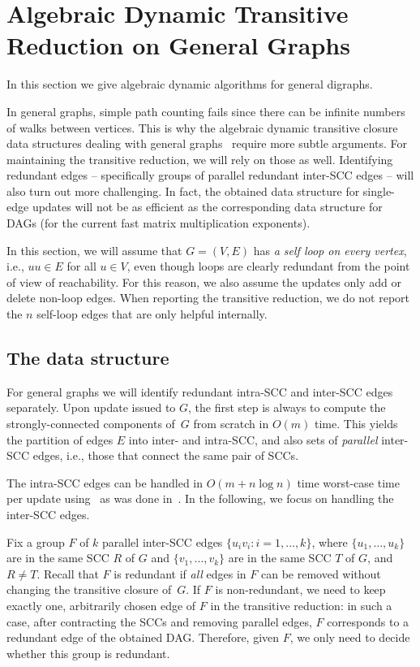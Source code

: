 \documentclass[11pt]{article}
\begin{document}
{ \section{Algebraic Dynamic Transitive Reduction on General Graphs}
\label{sec:app_algebraic_general}

In this section we give algebraic dynamic algorithms for general digraphs.


In general graphs, simple path counting fails since there can be infinite
numbers of walks between vertices. This is why the algebraic dynamic transitive closure
data structures dealing with general graphs~\cite{Sankowski04} require
more subtle arguments. For maintaining the transitive reduction, we will
rely on those as well. Identifying redundant edges -- specifically groups of parallel
redundant inter-SCC edges -- will also turn out more challenging.
In fact, the obtained data structure for single-edge updates will not be as efficient
as the corresponding data structure for DAGs (for the current fast matrix multiplication exponents).

In this section, we will assume that $G=(V,E)$ has \emph{a self loop on every vertex},
i.e., $uu\in E$ for all $u\in V$, even though loops are clearly
redundant from the point of view of reachability.
For this reason, we also assume the updates only add or delete non-loop edges.
When reporting the transitive reduction, we do not report the $n$ self-loop edges
that are only helpful internally.

\newcommand{\asymb}{\tilde{A}}

\subsection{The data structure}
For general graphs we will identify redundant intra-SCC and inter-SCC edges separately.
Upon update issued to $G$, the first step is always to compute the strongly-connected
components of~$G$ from scratch in $O(m)$ time.
This yields the partition of edges $E$ into inter- and intra-SCC, and also sets of \emph{parallel} inter-SCC edges, i.e., those that connect
the same pair of SCCs.

The intra-SCC edges can be handled in $O(m+n\log{n})$ time worst-case time per update using~ as was done in~.
In the following, we focus on handling the inter-SCC edges.

Fix a group $F$ of $k$ parallel inter-SCC edges $\{u_iv_i:i=1,\ldots,k\}$,
where
$\{u_1,\ldots,u_k\}$ are in the same SCC $R$ of $G$
and $\{v_1,\ldots,v_k\}$ are in the same SCC $T$ of $G$,
and $R\neq T$.
Recall that $F$ is redundant if \emph{all} edges in $F$ can be removed without changing the transitive closure of~$G$. If $F$ is non-redundant, we need to keep exactly one, arbitrarily chosen
edge of $F$ in the transitive reduction: in such a case, after contracting the SCCs and removing parallel edges, $F$ corresponds to a redundant edge of the obtained DAG.
Therefore, given $F$, we only need to decide whether this group is redundant. 

}
\end{document}
